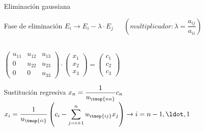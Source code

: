 \documentclass [8pt] {beamer}
\begin{document}
        \begin{frame}{Eliminación gaussiana}
            \begin{block}{Fase de eliminación}
                {$E_i \rightarrow E_i - \lambda \cdot E_j \ \ \ \ \ \ \ ( multiplicador: 
                \lambda = \dfrac{a_{i j}}{a_{i i}})$} \\ \ \\
                \begin{center}
                    {$\left( \begin{array}{ccc}
                    u_{11} & u_{12} & u_{13}\\ 0 & u_{22} & u_{23}\\ 0 & 0 & u_{33}
                    \end{array} \right) \cdot \left( \begin{array}{c}
                    x_1\\  x_2\\  x_3
                        \end{array} \right) = \left( \begin{array}{c}
                    c_1\\  c_2\\  c_3
                    \end{array} \right)$}
                \end{center}
            \end{block}
            \begin{block}{Sustitución regresiva}
                $ x_n = \dfrac{1}{u_{\tmop{nn}}} c_{n}\\ \ \\$
                $x_i = \dfrac{1}{u_{\tmop{ii}}} \left( c_i - 
                \displaystyle\sum^n_{j = i + 1} u_{\tmop{ij}}
                x_j \right) \rightarrow i = n - 1 , \ldot , 1$
            \end{block}
        \end{frame}
\end{document}
